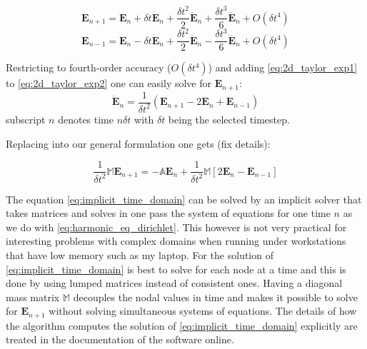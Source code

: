 \begin{equation}
\mathbf{E}_{n+1} = \mathbf{E}_n + \delta t \dot{\mathbf{E}}_n +\frac{\delta t^2}{2} \ddot{\mathbf{E}}_n +\frac{\delta t^3}{6} \dddot{\mathbf{E}}_n+ O(\delta t^4)
\label{eq:2d_taylor_exp1}
\end{equation}
\begin{equation}
\mathbf{E}_{n-1} = \mathbf{E}_n - \delta t \dot{\mathbf{E}}_n +\frac{\delta t^2}{2} \ddot{\mathbf{E}}_n-\frac{\delta t^3}{6} \dddot{\mathbf{E}}_n+ O(\delta t^4)
\label{eq:2d_taylor_exp2}
\end{equation}

Restricting to fourth-order accuracy ($O(\delta t^4)$) and  adding \ref{eq:2d_taylor_exp1} to \ref{eq:2d_taylor_exp2} one can easily solve for $\mathbf{E}_{n+1}$:
\begin{equation}
\ddot{\mathbf{E}}_n = \frac{1}{\delta t^2}\left(\mathbf{E}_{n+1}-2 \mathbf{E}_{n} + \mathbf{E}_{n-1}\right)
\label{eq:central-difference}
\end{equation}
subscript $n$ denotes time $n\delta t$ with $\delta t$ being the selected timestep.

Replacing into our general formulation one gets (fix details):

\begin{equation}
\frac{1}{\delta t^2} \mathbb{M} \mathbf{E}_{n+1} = - \mathbb{A}\mathbf{E}_n + \frac{1}{\delta t^2}\mathbb{M}\left[2
\mathbf{E}_{n}-\mathbf{E}_{n-1}
\right] 	 
\label{eq:implicit_time_domain}
\end{equation}

The equation \ref{eq:implicit_time_domain} can be solved by an implicit solver that takes matrices and solves in one pass the system of equations for one time $n$ as we do with \ref{eq:harmonic_eq_dirichlet}. This however is not very practical for interesting problems with complex domains when running under workstations that have low memory such as my laptop. For the solution of \ref{eq:implicit_time_domain} is best to solve for each node at a time and this is done by using lumped matrices instead of consistent ones. Having a diagonal mass matrix $\mathbb{M}$ decouples the nodal values in time and makes it possible to solve for $\mathbf{E}_{n+1}$ without solving simultaneous systems of equations. The details of how the algorithm computes the solution of \ref{eq:implicit_time_domain} explicitly are treated in the documentation of the software online.
